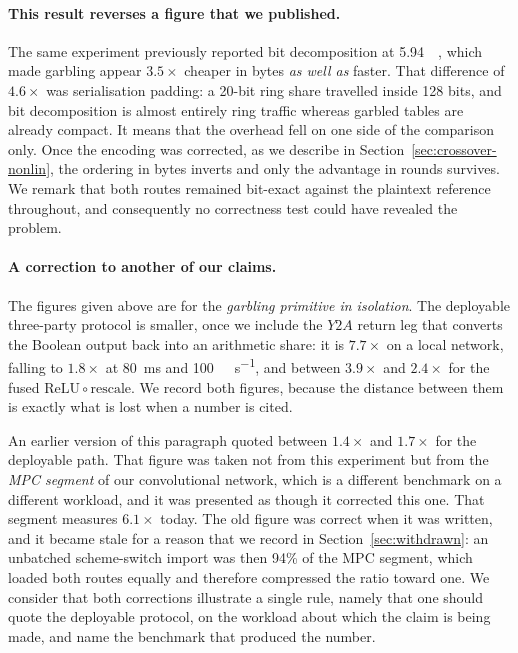 \documentclass[11pt]{article}
\newcommand{\ReLU}{\ensuremath{\mathrm{ReLU}}}
\begin{document}
\paragraph{This result reverses a figure that we published.} The same experiment
previously reported bit decomposition at \SI{5.94}{\mega\byte}, which made garbling appear
$3.5\times$ cheaper in bytes \emph{as well as} faster. That difference of $4.6\times$ was
serialisation padding: a 20-bit ring share travelled inside 128 bits, and bit decomposition is
almost entirely ring traffic whereas garbled tables are already compact. It means that the
overhead fell on one side of the comparison only. Once the encoding was corrected, as we
describe in Section~\ref{sec:crossover-nonlin}, the ordering in bytes inverts and only the
advantage in rounds survives. We remark that both routes remained bit-exact against the
plaintext reference throughout, and consequently no correctness test could have revealed the
problem.

\paragraph{A correction to another of our claims.} The figures given above are for the
\emph{garbling primitive in isolation}. The deployable three-party protocol is smaller, once
we include the $Y2A$ return leg that converts the Boolean output back into an arithmetic
share: it is $7.7\times$ on a local network, falling to $1.8\times$ at \SI{80}{\milli\second}
and \SI{100}{\mega\bit\per\second}, and between $3.9\times$ and $2.4\times$ for the fused
$\ReLU\circ\text{rescale}$. We record both figures, because the distance between them is
exactly what is lost when a number is cited.

An earlier version of this paragraph quoted between $1.4\times$ and $1.7\times$ for the
deployable path. That figure was taken not from this experiment but from the \emph{MPC
segment} of our convolutional network, which is a different benchmark on a different workload,
and it was presented as though it corrected this one. That segment measures $6.1\times$ today.
The old figure was correct when it was written, and it became stale for a reason that we record
in Section~\ref{sec:withdrawn}: an unbatched scheme-switch import was then 94\% of the MPC
segment, which loaded both routes equally and therefore compressed the ratio toward one. We
consider that both corrections illustrate a single rule, namely that one should quote the
deployable protocol, on the workload about which the claim is being made, and name the
benchmark that produced the number.
\end{document}
